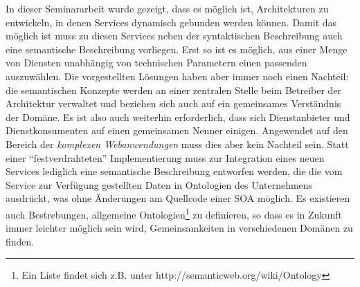 In dieser Seminararbeit wurde gezeigt, dass es möglich ist, Architekturen zu entwickeln, in denen Services dynamisch gebunden werden können. Damit das möglich ist muss zu diesen Services neben der syntaktischen Beschreibung auch eine semantische Beschreibung vorliegen. Erst so ist es möglich, aus einer Menge von Diensten unabhängig von technischen Parametern einen passenden auszuwählen. Die vorgestellten Lösungen haben aber immer noch einen Nachteil: die semantischen Konzepte werden an einer zentralen Stelle beim Betreiber der Architektur verwaltet und beziehen sich auch auf ein gemeinsames Verständnis der Domäne. Es ist also auch weiterhin erforderlich, dass sich Dienstanbieter und Dienstkonsumenten auf einen gemeinsamen Nenner einigen. 
Angewendet auf den Bereich der \emph{komplexen Webanwendungen} muss dies aber kein Nachteil sein. Statt einer "`festverdrahteten"' Implementierung muss zur Integration eines neuen Services lediglich eine semantische Beschreibung entworfen werden, die die vom Service zur Verfügung gestellten Daten in Ontologien des Unternehmens ausdrückt, was ohne Änderungen am Quellcode einer \ac{SOA} möglich. Es existieren auch Bestrebungen, allgemeine Ontologien\footnote{Ein Liste findet sich z.B. unter http://semanticweb.org/wiki/Ontology} zu definieren, so dass es in Zukunft immer leichter möglich sein wird, Gemeinsamkeiten in verschiedenen Domänen zu finden.
